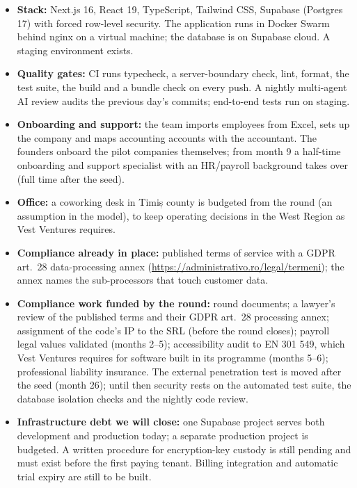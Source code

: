 \documentclass[10pt,a4paper]{article}
\begin{document}
\begin{itemize}
\item \textbf{Stack:} Next.js 16, React 19, TypeScript, Tailwind CSS, Supabase (Postgres 17) with
  forced row-level security. The application runs in Docker Swarm behind nginx on a virtual machine;
  the database is on Supabase cloud. A staging environment exists.
\item \textbf{Quality gates:} CI runs typecheck, a server-boundary check, lint, format, the test
  suite, the build and a bundle check on every push. A nightly multi-agent AI review audits the
  previous day's commits; end-to-end tests run on staging.
\item \textbf{Onboarding and support:} the team imports employees from Excel, sets up the company
  and maps accounting accounts with the accountant. The founders onboard the pilot companies
  themselves; from month 9 a half-time onboarding and support specialist with an HR/payroll
  background takes over (full time after the seed).
\item \textbf{Office:} a coworking desk in Timiș county is budgeted from the round (an assumption
  in the model), to keep operating decisions in the West Region as Vest Ventures requires.
\item \textbf{Compliance already in place:} published terms of service with a GDPR art.~28
  data-processing annex (\url{https://administrativo.ro/legal/termeni}); the annex names the
  sub-processors that touch customer data.
\item \textbf{Compliance work funded by the round:} round documents; a lawyer's review of the
  published terms and their GDPR art.~28 processing annex; assignment of the code's IP to the SRL
  (before the round closes); payroll legal
  values validated (months 2--5); accessibility audit to EN 301 549, which Vest Ventures requires for
  software built in its programme (months 5--6); professional liability insurance. The external
  penetration test is moved after the seed (month 26); until then security rests on the automated
  test suite, the database isolation checks and the nightly code review.
\item \textbf{Infrastructure debt we will close:} one Supabase project serves both development and
  production today; a separate production project is budgeted. A written procedure for
  encryption-key custody is still pending and must exist before the first paying tenant. Billing integration and
  automatic trial expiry are still to be built.
\end{itemize}
\end{document}
